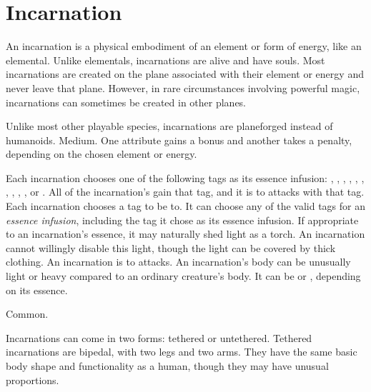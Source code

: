 \section{Incarnation}

  An incarnation is a physical embodiment of an element or form of energy, like an elemental.
  Unlike elementals, incarnations are alive and have souls.
  Most incarnations are created on the plane associated with their element or energy and never leave that plane.
  However, in rare circumstances involving powerful magic, incarnations can sometimes be created in other planes.

   Unlike most other playable species, incarnations are planeforged instead of humanoids.
   Medium.
   One attribute gains a  bonus and another takes a  penalty, depending on the chosen element or energy.
  \begin{itemize}
     Each incarnation chooses one of the following tags as its essence infusion: \atAcid, \atAir, \atAuditory, \atCold, \atCompulsion, \atEarth, \atEmotion, \atElectricity, \atFire, \atVisual, or \atWater.
      All of the incarnation's  gain that tag, and it is \impervious to attacks with that tag.
     Each incarnation chooses a tag to be \vulnerable to.
      It can choose any of the valid tags for an \textit{essence infusion}, including the tag it chose as its essence infusion.
     If appropriate to an incarnation's essence, it may naturally shed light as a torch.
      An incarnation cannot willingly disable this light, though the light can be covered by thick clothing.
     An incarnation is \impervious to \atPoison attacks.
     An incarnation's body can be unusually light or heavy compared to an ordinary creature's body.
      It can be  or , depending on its essence.
  \end{itemize}
   Common.

  Incarnations can come in two forms: tethered or untethered.
  Tethered incarnations are bipedal, with two legs and two arms.
  They have the same basic body shape and functionality as a human, though they may have unusual proportions.

